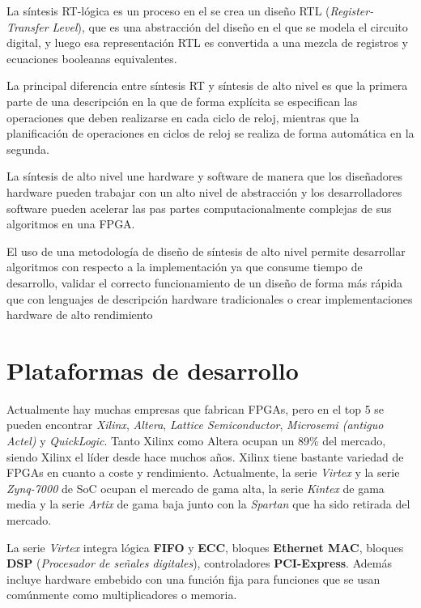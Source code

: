 La síntesis RT-lógica es un proceso en el se crea un diseño RTL (\textit{Register-Transfer Level}), que es una abstracción del diseño 
en el que se modela el circuito digital, y luego esa representación RTL es convertida a una mezcla de registros y ecuaciones 
booleanas equivalentes. 

La principal diferencia entre síntesis RT y síntesis de alto nivel es que la primera parte de una descripción en la que de forma 
explícita se especifican las operaciones que deben realizarse en cada ciclo de reloj, mientras que la planificación de operaciones 
en ciclos de reloj se realiza de forma automática en la segunda.

La síntesis de alto nivel une hardware y software de manera que los diseñadores hardware pueden trabajar con un alto nivel de abstracción 
y los desarrolladores software pueden acelerar las pas partes computacionalmente complejas de sus algoritmos en una FPGA. 

El uso de una metodología de diseño de síntesis de alto nivel permite desarrollar algoritmos con respecto a la implementación ya que 
consume tiempo de desarrollo, validar el correcto funcionamiento de un diseño de forma más rápida que con lenguajes de descripción 
hardware tradicionales o crear implementaciones hardware de alto rendimiento

\section{Plataformas de desarrollo} 

Actualmente hay muchas empresas que fabrican FPGAs, pero en el top 5 se pueden encontrar \textit{Xilinx}, \textit{Altera}, 
\textit{Lattice Semiconductor}, \textit{Microsemi (antiguo Actel)} y \textit{QuickLogic}. Tanto Xilinx como Altera ocupan un 89\% 
del mercado, siendo Xilinx el líder desde hace muchos años. Xilinx tiene bastante variedad de FPGAs en cuanto a coste y rendimiento. 
Actualmente, la serie \textit{Virtex} y la serie \textit{Zynq-7000} de SoC ocupan el mercado de gama alta, la serie \textit{Kintex} 
de gama media y la serie \textit{Artix} de gama baja junto con la \textit{Spartan} que ha sido retirada del mercado.

La serie \textit{Virtex} integra lógica \textbf{FIFO} y \textbf{ECC}, bloques \textbf{Ethernet MAC}, bloques \textbf{DSP} (\textit{Procesador 
de señales digitales}), controladores \textbf{PCI-Express}. Además incluye hardware embebido con una función fija para funciones que se 
usan comúnmente como multiplicadores o memoria. 

